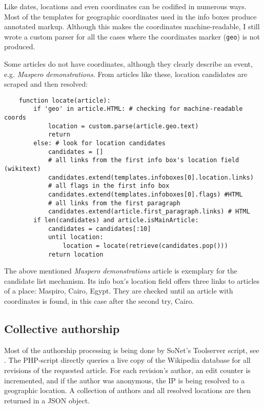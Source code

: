 Like dates, locations and even coordinates can be codified in numerous ways. 
Most of the templates for geographic coordinates used in the info boxes produce annotated markup.
Although this makes the coordinates machine-readable, I still wrote a custom parser for all the cases where the coordinates marker (\verb"geo") is not produced.

Some articles do not have coordinates, although they clearly describe an event, e.g. \emph{Maspero demonstrations}.
From articles like these, location candidates are scraped and then resolved:

\begin{lstlisting}
	function locate(article):
		if 'geo' in article.HTML: # checking for machine-readable coords
			location = custom.parse(article.geo.text)
			return
		else: # look for location candidates
			candidates = []
			# all links from the first info box's location field (wikitext)
			candidates.extend(templates.infoboxes[0].location.links)
			# all flags in the first info box 
			candidates.extend(templates.infoboxes[0].flags) #HTML
			# all links from the first paragraph
			candidates.extend(article.first_paragraph.links) # HTML
		if len(candidates) and article.isMainArticle:
			candidates = candidates[:10]
			until location:
				location = locate(retrieve(candidates.pop()))
			return location
\end{lstlisting}

The above mentioned \emph{Maspero demonstrations} article is exemplary for the candidate list mechanism.
Its info box's location field offers three links to articles of a place: Maspiro, Cairo, Egypt.
They are checked until an article with coordinates is found, in this case after the second try, Cairo.

\subsection{Collective authorship}\label{sub:authorshipalgorithm}

Most of the authorship processing is being done by SoNet's Toolserver script, see .
The \ac{PHP}-script directly queries a live copy of the Wikipedia database for all revisions of the requested article.
For each revision's author, an edit counter is incremented, and if the author was anonymous, the \ac{IP} is being resolved to a geographic location.
A collection of authors and all resolved locations are then returned in a \ac{JSON} object. 

